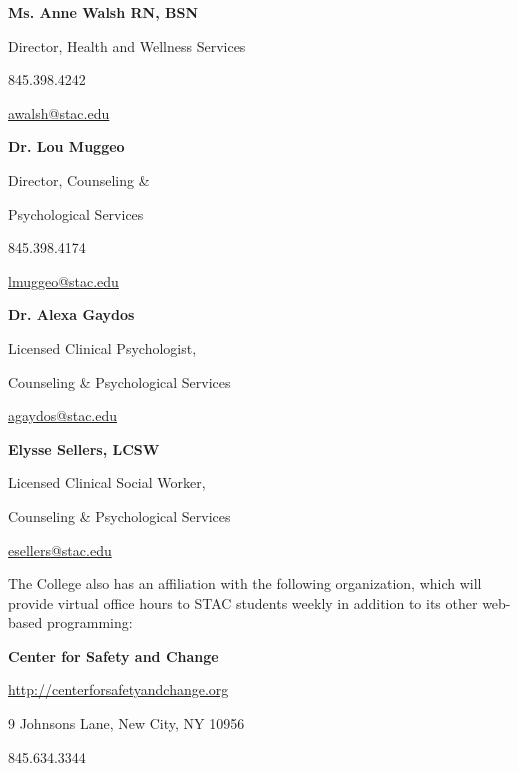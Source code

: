 \documentclass[11pt,letterpaper]{article}
\begin{document}
	\hfill\begin{minipage}[t]{0.49\textwidth}
	{\bfseries Ms. Anne Walsh RN, BSN} \par
	Director, Health and Wellness Services \par
	845.398.4242 \par
	\href{mailto:awalsh@stac.edu}{awalsh@stac.edu}
	\end{minipage}\begin{minipage}[t]{0.49\textwidth}
	{\bfseries Dr. Lou Muggeo} \par
	Director, Counseling \& \par
	Psychological Services \par
	845.398.4174 \par
	\href{mailto:lmuggeo@stac.edu}{lmuggeo@stac.edu}
        \end{minipage} \pspace
        \hfill\begin{minipage}[t]{0.49\textwidth} 
 	{\bfseries Dr. Alexa Gaydos} \par
	Licensed Clinical Psychologist, \par
	Counseling \& Psychological Services \par
	\href{mailto:agaydos@stac.edu}{agaydos@stac.edu}
	\end{minipage}\begin{minipage}[t]{0.49\textwidth} 
	{\bfseries Elysse Sellers, LCSW} \par
	Licensed Clinical Social Worker, \par
	Counseling \& Psychological Services \par
	\href{mailto:esellers@stac.edu}{esellers@stac.edu}
        \end{minipage} \pspace
 
The College also has an affiliation with the following organization, which will provide virtual office hours to STAC students weekly in addition to its other web-based programming: \pspace
 
        \hspace{0.3cm} {\bfseries Center for Safety and Change} \par
        \hspace{0.3cm} \url{http://centerforsafetyandchange.org} \par
        \hspace{0.3cm} 9 Johnsons Lane, New City, NY 10956 \par
        \hspace{0.3cm} 845.634.3344
\pspace
\end{document}
